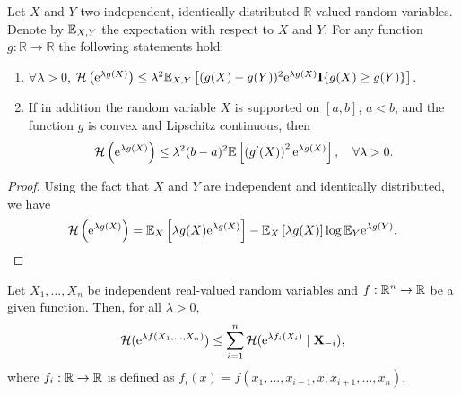 \begin{definition}
\end{definition}
\begin{lemma}
	\label{lem:entropy-bound-univariate}
	Let $X$ and $Y$ two independent, identically distributed $\mathbb{R}$-valued random variables. Denote by ${\mathbb E}_{X, Y}$ the expectation with respect to $X$ and $Y$. For any function $g: \mathbb{R} \rightarrow \mathbb{R}$ the following statements hold:
	\begin{enumerate}
		\item $\forall\lambda>0$, ${\mathcal H}\left(\mathrm{e}^{\lambda g(X)}\right) \leq \lambda^2 {\mathbb E}_{X, Y}\left[(g(X)-g(Y))^2\mathrm{e}^{\lambda g(X)}{\bf I}\{g(X) \geq g(Y)\}\right]$.
		\item If in addition the random variable $X$ is supported on $[a, b]$, $a<b$, and the function $g$ is convex and Lipschitz continuous, then
		      \begin{equation*}
			      {\mathcal H}\left(\mathrm{e}^{\lambda g(X)}\right) \leq \lambda^2(b-a)^2 {\mathbb E}\left[\left(g^{\prime}(X)\right)^2 \mathrm{e}^{\lambda g(X)}\right],\quad\forall\lambda>0.
		      \end{equation*}
	\end{enumerate}
\end{lemma}

\begin{proof}
	Using the fact that $X$ and $Y$ are independent and identically distributed, we have
	\begin{equation*}
		{\mathcal H}\left(\mathrm{e}^{\lambda g(X)}\right)={\mathbb E}_{X}\left[\lambda g(X)\mathrm{e}^{\lambda g(X)}\right]-{\mathbb E}_{X}\left[\lambda g(X)\right]\log{\mathbb E}_{Y}\mathrm{e}^{\lambda g(Y)}.
	\end{equation*}
\end{proof}

\begin{lemma}
	\label{lem:tensorisation-entropy}
	Let \(X_{1}, \ldots, X_{n}\) be independent real-valued random variables and \(f:{\mathbb R}^{n}\to{\mathbb R}\) be a given function. Then, for all \(\lambda>0\),
	\begin{equation*}
		{\mathcal H}(\mathrm{e}^{\lambda f(X_{1}, \ldots, X_{n})})\leq\sum_{i=1}^{n}{\mathcal H}(\mathrm{e}^{\lambda f_{i}(X_{i})}\mid {\bf X}_{-i}),
	\end{equation*}
	where \(f_{i}:{\mathbb R}\to{\mathbb R}\) is defined as \(f_{i}(x)=f(x_{1}, \ldots, x_{i-1}, x, x_{i+1}, \ldots, x_{n})\).
\end{lemma}

